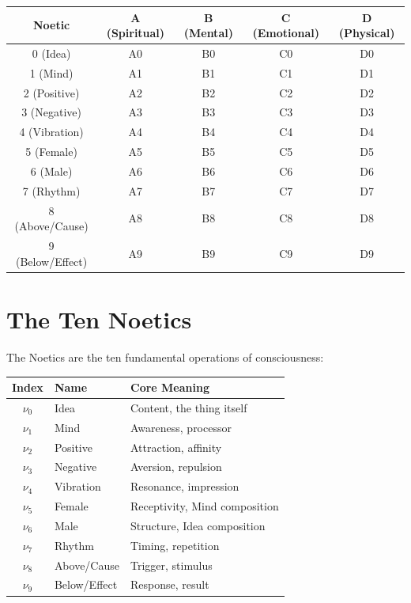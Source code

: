\documentclass[11pt,twoside,openright]{book}
\theoremstyle{definition}
\theoremstyle{plain}
\theoremstyle{remark}
\newcommand{\noe}[1]{\nu_{#1}}
\begin{document}
\begin{center}
\begin{tabular}{c|cccc}
\toprule
\textbf{Noetic} & \textbf{A (Spiritual)} & \textbf{B (Mental)} & \textbf{C (Emotional)} & \textbf{D (Physical)} \\
\midrule
0 (Idea) & A0 & B0 & C0 & D0 \\
1 (Mind) & A1 & B1 & C1 & D1 \\
2 (Positive) & A2 & B2 & C2 & D2 \\
3 (Negative) & A3 & B3 & C3 & D3 \\
4 (Vibration) & A4 & B4 & C4 & D4 \\
5 (Female) & A5 & B5 & C5 & D5 \\
6 (Male) & A6 & B6 & C6 & D6 \\
7 (Rhythm) & A7 & B7 & C7 & D7 \\
8 (Above/Cause) & A8 & B8 & C8 & D8 \\
9 (Below/Effect) & A9 & B9 & C9 & D9 \\
\bottomrule
\end{tabular}
\end{center}

\section{The Ten Noetics}
\label{sec:ten-noetics}

The Noetics are the ten fundamental operations of consciousness:

\begin{center}
\begin{tabular}{cll}
\toprule
\textbf{Index} & \textbf{Name} & \textbf{Core Meaning} \\
\midrule
$\noe{0}$ & Idea & Content, the thing itself \\
$\noe{1}$ & Mind & Awareness, processor \\
$\noe{2}$ & Positive & Attraction, affinity \\
$\noe{3}$ & Negative & Aversion, repulsion \\
$\noe{4}$ & Vibration & Resonance, impression \\
$\noe{5}$ & Female & Receptivity, Mind composition \\
$\noe{6}$ & Male & Structure, Idea composition \\
$\noe{7}$ & Rhythm & Timing, repetition \\
$\noe{8}$ & Above/Cause & Trigger, stimulus \\
$\noe{9}$ & Below/Effect & Response, result \\
\bottomrule
\end{tabular}
\end{center}
\end{document}
